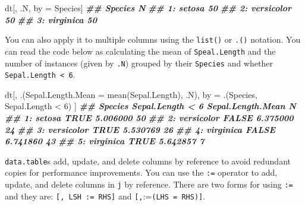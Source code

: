 \documentclass[
]{book}
\newenvironment{Shaded}{\begin{snugshade}}{\end{snugshade}}
\newcommand{\AttributeTok}[1]{\textcolor[rgb]{0.77,0.63,0.00}{#1}}
\newcommand{\DecValTok}[1]{\textcolor[rgb]{0.00,0.00,0.81}{#1}}
\newcommand{\DocumentationTok}[1]{\textcolor[rgb]{0.56,0.35,0.01}{\textbf{\textit{#1}}}}
\newcommand{\FunctionTok}[1]{\textcolor[rgb]{0.00,0.00,0.00}{#1}}
\newcommand{\NormalTok}[1]{#1}
\newcommand{\OtherTok}[1]{\textcolor[rgb]{0.56,0.35,0.01}{#1}}
\newcommand{\SpecialCharTok}[1]{\textcolor[rgb]{0.00,0.00,0.00}{#1}}
\begin{document}
\begin{Shaded}
\begin{Highlighting}[]

\NormalTok{dt[, .N, by }\OtherTok{=}\NormalTok{ Species]}
\DocumentationTok{\#\#       Species  N}
\DocumentationTok{\#\# 1:     setosa 50}
\DocumentationTok{\#\# 2: versicolor 50}
\DocumentationTok{\#\# 3:  virginica 50}
\end{Highlighting}
\end{Shaded}

You can also apply it to multiple columns using the \texttt{list()} or \texttt{.()} notation. You can read the code below as calculating the mean of \texttt{Speal.Length} and the number of instances (given by \texttt{.N}) grouped by their \texttt{Species} and whether \texttt{Sepal.Length\ \textless{}\ 6}.

\begin{Shaded}
\begin{Highlighting}[]
\NormalTok{dt[, .(}\AttributeTok{Sepal.Length.Mean =} \FunctionTok{mean}\NormalTok{(Sepal.Length), .N),}
\NormalTok{  by }\OtherTok{=}\NormalTok{ .(Species, Sepal.Length }\SpecialCharTok{\textless{}} \DecValTok{6}\NormalTok{)}
\NormalTok{]}
\DocumentationTok{\#\#       Species Sepal.Length \textless{} 6 Sepal.Length.Mean  N}
\DocumentationTok{\#\# 1:     setosa             TRUE          5.006000 50}
\DocumentationTok{\#\# 2: versicolor            FALSE          6.375000 24}
\DocumentationTok{\#\# 3: versicolor             TRUE          5.530769 26}
\DocumentationTok{\#\# 4:  virginica            FALSE          6.741860 43}
\DocumentationTok{\#\# 5:  virginica             TRUE          5.642857  7}
\end{Highlighting}
\end{Shaded}

\texttt{data.table}s add, update, and delete columns by reference to avoid redundant copies for performance improvements. You can use the \texttt{:=} operator to add, update, and delete columns in \texttt{j} by reference. There are two forms for using \texttt{:=} and they are: \texttt{{[},\ LSH\ :=\ RHS{]}} and \texttt{{[},}:=\texttt{(LHS\ =\ RHS){]}}.
\end{document}
